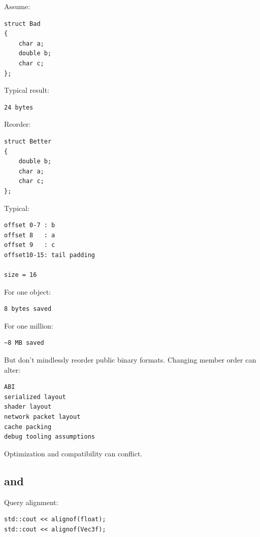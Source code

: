 Assume:

\begin{verbatim}
struct Bad
{
    char a;
    double b;
    char c;
};
\end{verbatim}

Typical result:

\begin{verbatim}
24 bytes
\end{verbatim}

Reorder:

\begin{verbatim}
struct Better
{
    double b;
    char a;
    char c;
};
\end{verbatim}

Typical:

\begin{verbatim}
offset 0-7 : b
offset 8   : a
offset 9   : c
offset10-15: tail padding

size = 16
\end{verbatim}

For one object:

\begin{verbatim}
8 bytes saved
\end{verbatim}

For one million:

\begin{verbatim}
~8 MB saved
\end{verbatim}

But don't mindlessly reorder public binary formats. Changing member order can alter:

\begin{verbatim}
ABI
serialized layout
shader layout
network packet layout
cache packing
debug tooling assumptions
\end{verbatim}

Optimization and compatibility can conflict.

\subsection{\texorpdfstring{ and }{ and }}\label{01-foundations-i-ch003-alignof-and-alignas}

\hypertarget{01-foundations-i-ch003-alignof-and-alignas}{}

Query alignment:

\begin{verbatim}
std::cout << alignof(float);
std::cout << alignof(Vec3f);
\end{verbatim}

